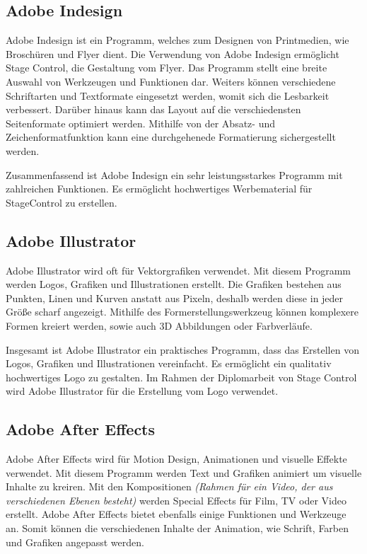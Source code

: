 \subsection{Adobe Indesign}
Adobe Indesign ist ein Programm, welches zum Designen von Printmedien, wie Broschüren und Flyer dient.
Die Verwendung von Adobe Indesign ermöglicht Stage Control, die Gestaltung vom Flyer. Das Programm stellt eine breite Auswahl von Werkzeugen und Funktionen dar. Weiters können verschiedene Schriftarten und Textformate eingesetzt werden, womit sich die Lesbarkeit verbessert. Darüber hinaus kann das Layout auf die verschiedensten Seitenformate optimiert werden. Mithilfe von der Absatz- und Zeichenformatfunktion kann eine durchgehenede Formatierung sichergestellt werden. \parencite{AdobeIndesign}

Zusammenfassend ist Adobe Indesign ein sehr leistungsstarkes Programm mit zahlreichen Funktionen. Es ermöglicht hochwertiges Werbematerial für StageControl zu erstellen.

\subsection{Adobe Illustrator}
Adobe Illustrator wird oft für Vektorgrafiken verwendet. Mit diesem Programm werden Logos, Grafiken und Illustrationen erstellt. Die Grafiken bestehen aus Punkten, Linen und Kurven anstatt aus Pixeln, deshalb werden diese in jeder Größe scharf angezeigt. Mithilfe des Formerstellungswerkzeug können komplexere Formen kreiert werden, sowie auch 3D Abbildungen oder Farbverläufe. \parencite{AdobeIllustrator}

Insgesamt ist Adobe Illustrator ein praktisches Programm, dass das Erstellen von Logos, Grafiken und Illustrationen vereinfacht. Es ermöglicht ein qualitativ hochwertiges Logo zu gestalten. Im Rahmen der Diplomarbeit von Stage Control wird Adobe Illustrator für die Erstellung vom Logo verwendet. 

\subsection{Adobe After Effects}
Adobe After Effects wird für Motion Design, Animationen und visuelle Effekte verwendet. Mit diesem Programm werden Text und Grafiken animiert um visuelle Inhalte zu kreiren. Mit den Kompositionen \textit{(Rahmen für ein Video, der aus verschiedenen Ebenen besteht)} werden Special Effects für Film, TV oder Video erstellt. Adobe After Effects bietet ebenfalls einige Funktionen und Werkzeuge an. Somit können die verschiedenen Inhalte der Animation, wie Schrift, Farben und Grafiken angepasst werden. \parencite{AdobeAfterEffects}

